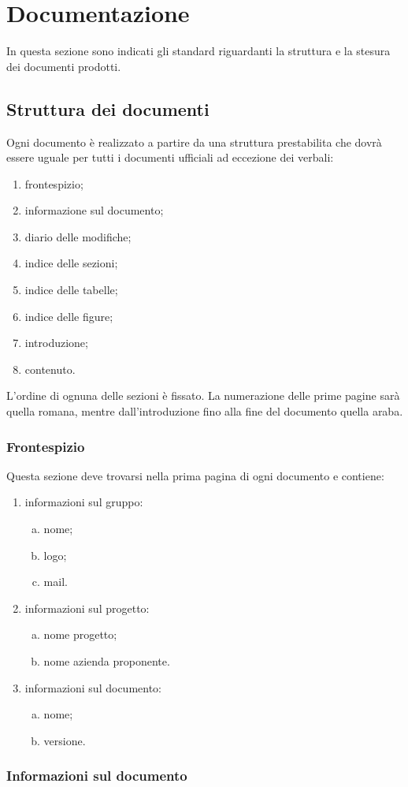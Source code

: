 \documentclass[../NormeProgetto.tex]{subfiles}
\begin{document}
\section{Documentazione}
In questa sezione sono indicati gli standard riguardanti la struttura e la stesura dei documenti prodotti. 

	\subsection{Struttura dei documenti}
	Ogni documento è realizzato a partire da una struttura prestabilita che dovrà essere uguale per tutti i documenti ufficiali ad eccezione dei verbali:
	\begin{enumerate}
	\item frontespizio;
	\item informazione sul documento;
	\item diario delle modifiche;
	\item indice delle sezioni;
	\item indice delle tabelle;
	\item indice delle figure;
	\item introduzione;
	\item contenuto.
	\end{enumerate} 
	L'ordine di ognuna delle sezioni è fissato. La numerazione delle prime pagine sarà quella romana, mentre dall'introduzione fino alla fine del documento quella araba.

	\subsubsection{Frontespizio}	
	Questa sezione deve trovarsi nella prima pagina di ogni documento e contiene:
	\begin{enumerate}
	\item informazioni sul gruppo:
		\begin{enumerate}[a.]
		\item nome;
		\item logo;
		\item mail.
		\end{enumerate}
	\item informazioni sul progetto:
		\begin{enumerate}[a.]
		\item nome progetto;
		\item nome azienda proponente.
		\end{enumerate}
	\item informazioni sul documento:
		\begin{enumerate}[a.]
		\item nome;
		\item versione.
		\end{enumerate}
	\end{enumerate}
	
	\subsubsection{Informazioni sul documento}
	
	
	
\end{document}
